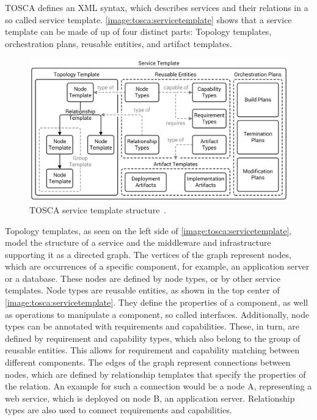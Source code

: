 TOSCA defines an XML syntax, which describes services and their relations in a so called service template.
\autoref{image:tosca:servicetemplate} shows that a service template can be made of up of four distinct parts: Topology templates, orchestration plans, reusable entities, and artifact templates.

\begin{figure}[!htbp]
	\centering
	\includegraphics[resolution=600]{fundamentals/assets/service_template}
	\caption{TOSCA service template structure~\autocite[based on][]{tosca:spec}.}
	\label{image:tosca:servicetemplate}
\end{figure}

Topology templates, as seen on the left side of \autoref{image:tosca:servicetemplate}, model the structure of a service and the middleware and infrastructure supporting it as a directed graph.
The vertices of the graph represent nodes, which are occurrences of a specific component, for example, an application server or a database.
These nodes are defined by node types, or by other service templates.
Node types are reusable entities,  as shown in the top center of \autoref{image:tosca:servicetemplate}.
They define the properties of a component, as well as operations to manipulate a component, so called interfaces.
Additionally, node types can be annotated with requirements and capabilities.
These, in turn, are defined by requirement and capability types, which also belong to the group of reusable entities.
This allows for requirement and capability matching between different components.
The edges of the graph represent connections between nodes, which are defined by relationship templates that specify the properties of the relation.
An example for such a connection would be a node A, representing a web service, which is deployed on node B, an application server.
Relationship types are also used to connect requirements and capabilities.

